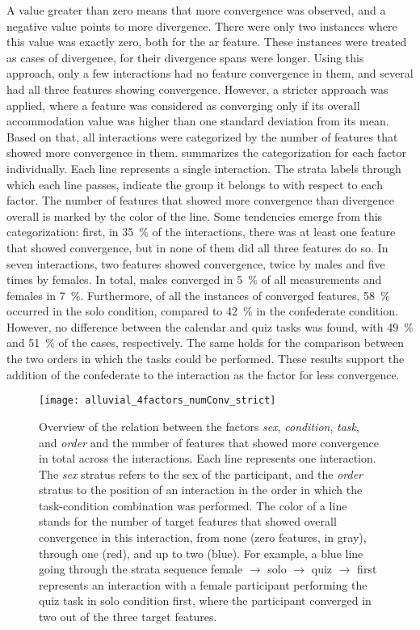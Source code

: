 A value greater than zero means that more convergence was observed, and a negative value points to more divergence.
There were only two instances where this value was exactly zero, both for the \ac{ar} feature.
These instances were treated as cases of divergence, for their divergence spans were longer.
Using this approach, only a few interactions had no feature convergence in them, and several had all three features showing convergence.
However, a stricter approach was applied, where a feature was considered as converging only if its overall accommodation value was higher than one standard deviation from its mean.
Based on that, all interactions were categorized by the number of features that showed more convergence in them.
 summarizes the categorization for each factor individually.
Each line represents a single interaction.
The strata labels through which each line passes, indicate the group it belongs to with respect to each factor.
The number of features that showed more convergence than divergence overall is marked by the color of the line.
Some tendencies emerge from this categorization:
first, in \SI{35}{\percent} of the interactions, there was at least one feature that showed convergence, but in none of them did all three features do so.
In seven interactions, two features showed convergence, twice by males and five times by females.
In total, males converged in \SI{5}{\percent} of all measurements and females in \SI{7}{\percent}.
Furthermore, of all the instances of converged features, \SI{58}{\percent} occurred in the solo condition, compared to \SI{42}{\percent} in the confederate condition.
However, no difference between the calendar and quiz tasks was found, with \SI{49}{\percent} and \SI{51}{\percent} of the cases, respectively.
The same holds for the comparison between the two orders in which the tasks could be performed.
These results support the addition of the confederate to the interaction as the factor for less convergence.
%
\begin{figure}[t]
	\centering
	\texttt{[image: alluvial\_4factors\_numConv\_strict]}
	\caption[Number of significantly different behaviors per factor]
		{Overview of the relation between the factors \emph{sex}, \emph{condition}, \emph{task}, and \emph{order} and the number of features that showed more convergence in total across the interactions.
		Each line represents one interaction.
		The \emph{sex} stratus refers to the sex of the participant, and the \emph{order} stratus to the position of an interaction in the order in which the task-condition combination was performed.
		The color of a line stands for the number of target features that showed overall convergence in this interaction, from none (zero features, in gray), through one (red), and up to two (blue).
		For example, a blue line going through the strata sequence female $\rightarrow$ solo $\rightarrow$ quiz $\rightarrow$ first represents an interaction with a female participant performing the quiz task in solo condition first, where the participant converged in two out of the three target features.}
	\label{fig:alluvial}
\end{figure}
%
